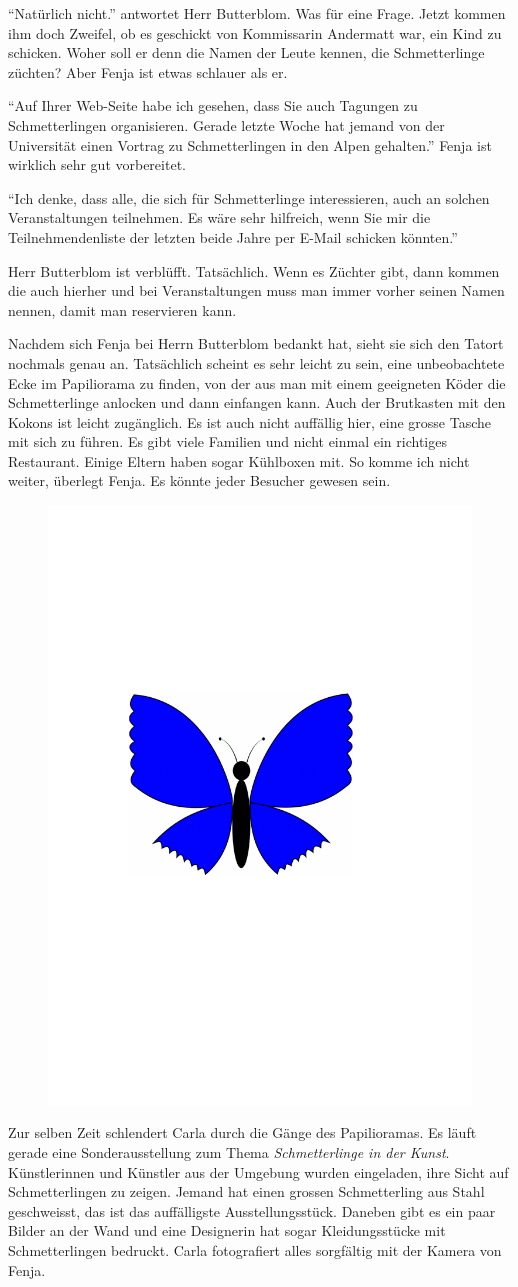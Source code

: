 \enquote{Natürlich nicht.} antwortet Herr Butterblom. Was für eine Frage. Jetzt kommen ihm doch Zweifel, ob es geschickt von Kommissarin Andermatt war, ein Kind zu schicken. Woher soll er denn die Namen der Leute kennen, die Schmetterlinge züchten? Aber Fenja ist etwas schlauer als er.

\enquote{Auf Ihrer Web-Seite habe ich gesehen, dass Sie auch Tagungen zu Schmetterlingen organisieren. Gerade letzte Woche hat jemand von der Universität einen Vortrag zu Schmetterlingen in den Alpen gehalten.} Fenja ist wirklich sehr gut vorbereitet. 

\enquote{Ich denke, dass alle, die sich für Schmetterlinge interessieren, auch an solchen Veranstaltungen teilnehmen. Es wäre sehr hilfreich, wenn Sie mir die Teilnehmendenliste der letzten beide Jahre per E-Mail schicken könnten.}

Herr Butterblom ist verblüfft. Tatsächlich. Wenn es Züchter gibt, dann kommen die auch hierher und bei Veranstaltungen muss man immer vorher seinen Namen nennen, damit man reservieren kann. 

Nachdem sich Fenja bei Herrn Butterblom bedankt hat, sieht sie sich den Tatort nochmals genau an. Tatsächlich scheint es sehr leicht zu sein, eine unbeobachtete Ecke im Papiliorama zu finden, von der aus man mit einem geeigneten Köder die Schmetterlinge anlocken und dann einfangen kann. Auch der Brutkasten mit den Kokons ist leicht zugänglich. Es ist auch nicht auffällig hier, eine grosse Tasche mit sich zu führen. Es gibt viele Familien und nicht einmal ein richtiges Restaurant. Einige Eltern haben sogar Kühlboxen mit. So komme ich nicht weiter, überlegt Fenja. Es könnte jeder Besucher gewesen sein.
\begin{figure}[H]
\centering
\includegraphics[width=.05\textwidth]{bilder/inkling.pdf}
\end{figure}
Zur selben Zeit schlendert Carla durch die Gänge des Papilioramas. Es läuft gerade eine Sonderausstellung zum Thema \emph{Schmetterlinge in der Kunst}. Künstlerinnen und Künstler aus der Umgebung wurden eingeladen, ihre Sicht auf Schmetterlingen zu zeigen. Jemand hat einen grossen Schmetterling aus Stahl geschweisst, das ist das auffälligste Ausstellungsstück. Daneben gibt es ein paar Bilder an der Wand und eine Designerin hat sogar Kleidungsstücke mit Schmetterlingen bedruckt. Carla fotografiert alles sorgfältig mit der Kamera von Fenja.

